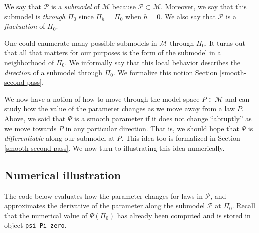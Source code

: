 \documentclass[
  11pt,
  openright,twoside]{book}
\newcommand{\calM}{\mathcal{M}}
\newcommand{\calP}{\mathcal{P}}
\theoremstyle{definition}
\theoremstyle{definition}
\theoremstyle{definition}
\theoremstyle{definition}
\theoremstyle{remark}
\begin{document}
We say that \(\calP\) is a \emph{submodel} of \(\calM\) because \(\calP \subset \calM\).
Moreover, we say that this submodel is \emph{through \(\Pi_0\)} since \(\Pi_{h} = \Pi_{0}\) when \(h = 0\). We also say that \(\calP\) is a \emph{fluctuation} of
\(\Pi_{0}\).

One could enumerate many possible submodels in \(\calM\) through \(\Pi_0\). It
turns out that all that matters for our purposes is the form of the submodel
in a neighborhood of \(\Pi_0\). We informally say that this local behavior
describes the \emph{direction} of a submodel through \(\Pi_0\). We formalize this
notion Section \ref{smooth-second-pass}.

We now have a notion of how to move through the model space \(P \in \calM\) and
can study how the value of the parameter changes as we move away from a law
\(P\). Above, we said that \(\Psi\) is a smooth parameter if it does not change
``abruptly'' as we move towards \(P\) in any particular direction. That is, we
should hope that \(\Psi\) is \emph{differentiable} along our submodel at \(P\). This idea too is formalized in Section \ref{smooth-second-pass}. We now turn
to illustrating this idea numerically.

\hypertarget{numerical-illus}{%
\subsection{Numerical illustration}\label{numerical-illus}}

The code below evaluates how the parameter changes for laws in \(\calP\), and
approximates the derivative of the parameter along the submodel \(\calP\) at
\(\Pi_0\). Recall that the numerical value of \(\Psi(\Pi_{0})\) has already been
computed and is stored in object \texttt{psi\_Pi\_zero}.
\end{document}
